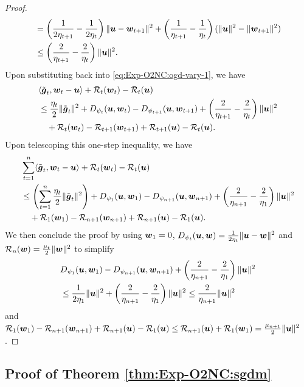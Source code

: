 \begin{proof}
\begin{align*}
    &= \left(\frac{1}{2\eta_{t+1}}-\frac{1}{2\eta_t}\right)\|{\boldsymbol{u}}-{\boldsymbol{w}}_{t+1}\|^2 + \left(\frac{1}{\eta_{t+1}}-\frac{1}{\eta_t}\right)(\|{\boldsymbol{u}}\|^2-\|{\boldsymbol{w}}_{t+1}\|^2) \\
    &\le \left(\frac{2}{\eta_{t+1}} - \frac{2}{\eta_t}\right)\|{\boldsymbol{u}}\|^2.
\end{align*}
Upon substituting back into \eqref{eq:Exp-O2NC:ogd-vary-1}, we have
\begin{align*}
    &\langle \tilde{{\boldsymbol{g}}}_t, {\boldsymbol{w}}_t-{\boldsymbol{u}}\rangle + {\cal R}_t({\boldsymbol{w}}_t) - {\cal R}_t({\boldsymbol{u}}) \\
    &\le \frac{\eta_t}{2}\|\tilde{{\boldsymbol{g}}}_t\|^2 + D_{\psi_t}({\boldsymbol{u}},{\boldsymbol{w}}_t) - D_{\psi_{t+1}}({\boldsymbol{u}},{\boldsymbol{w}}_{t+1}) + \left(\frac{2}{\eta_{t+1}} - \frac{2}{\eta_t}\right)\|{\boldsymbol{u}}\|^2 \\
    &\quad + {\cal R}_t({\boldsymbol{w}}_t) - {\cal R}_{t+1}({\boldsymbol{w}}_{t+1}) + {\cal R}_{t+1}({\boldsymbol{u}}) - {\cal R}_t({\boldsymbol{u}}).
\end{align*}
Upon telescoping this one-step inequality, we have
\begin{align*}
    &\sum_{t=1}^n \langle \tilde{{\boldsymbol{g}}}_t, {\boldsymbol{w}}_t-{\boldsymbol{u}}\rangle + {\cal R}_t({\boldsymbol{w}}_t) - {\cal R}_t({\boldsymbol{u}}) \\
    &\le \left( \sum_{t=1}^n \frac{\eta_t}{2}\|\tilde{{\boldsymbol{g}}}_t\|^2 \right) + D_{\psi_1}({\boldsymbol{u}},{\boldsymbol{w}}_1) - D_{\psi_{n+1}}({\boldsymbol{u}},{\boldsymbol{w}}_{n+1}) + \left(\frac{2}{\eta_{n+1}} - \frac{2}{\eta_1}\right)\|{\boldsymbol{u}}\|^2 \\
    &\quad + {\cal R}_1({\boldsymbol{w}}_1) - {\cal R}_{n+1}({\boldsymbol{w}}_{n+1}) + {\cal R}_{n+1}({\boldsymbol{u}}) - {\cal R}_1({\boldsymbol{u}}).
\end{align*}
We then conclude the proof by using ${\boldsymbol{w}}_1=0$, $D_{\psi_t}({\boldsymbol{u}},{\boldsymbol{w}})=\frac{1}{2\eta_t}\|{\boldsymbol{u}}-{\boldsymbol{w}}\|^2$ and ${\cal R}_n({\boldsymbol{w}})=\frac{\mu_t}{2}\|{\boldsymbol{w}}\|^2$ to simplify
\begin{align*}
    & D_{\psi_1}({\boldsymbol{u}},{\boldsymbol{w}}_1) - D_{\psi_{n+1}}({\boldsymbol{u}},{\boldsymbol{w}}_{n+1}) + \left(\frac{2}{\eta_{n+1}} - \frac{2}{\eta_1}\right)\|{\boldsymbol{u}}\|^2 \\
    &\le \frac{1}{2\eta_1}\|{\boldsymbol{u}}\|^2 + \left(\frac{2}{\eta_{n+1}} - \frac{2}{\eta_1}\right)\|{\boldsymbol{u}}\|^2 \le \frac{2}{\eta_{n+1}}\|{\boldsymbol{u}}\|^2
\end{align*}
and ${\cal R}_1({\boldsymbol{w}}_1) - {\cal R}_{n+1}({\boldsymbol{w}}_{n+1}) + {\cal R}_{n+1}({\boldsymbol{u}}) - {\cal R}_1({\boldsymbol{u}}) \le {\cal R}_{n+1}({\boldsymbol{u}}) + {\cal R}_1({\boldsymbol{w}}_1) = \frac{\mu_{n+1}}{2}\|{\boldsymbol{u}}\|^2$.
\end{proof}


\subsection{Proof of Theorem \ref{thm:Exp-O2NC:sgdm}}

